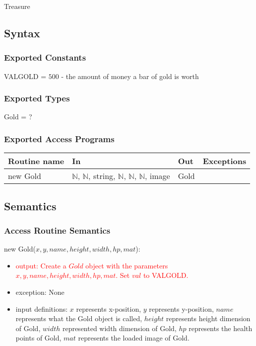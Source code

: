 \documentclass[12pt]{article}
\newcommand{\m}[1]{\mbox{#1}}
\begin{document}
Treasure

\subsection*{Syntax}

\subsubsection*{Exported Constants}

VALGOLD = $500$ - the amount of money a bar of gold is worth

\subsubsection*{Exported Types}

Gold = ?

\subsubsection*{Exported Access Programs}

\begin{tabular}{| l | l | l | l |}
\hline
\textbf{Routine name} & \textbf{In} & \textbf{Out} & \textbf{Exceptions}\\
\hline
new Gold & $\mathbb{N}$, $\mathbb{N}$, string, $\mathbb{N}$, $\mathbb{N}$, $\mathbb{N}$, image & Gold & ~\\
\hline
\end{tabular}

\subsection*{Semantics}

\subsubsection*{Access Routine Semantics}

new Gold($x, y, name, height, width, hp, mat$):
\begin{itemize}
    \item \textcolor{red}{output: Create a $Gold$ object with the parameters $x, y, name, height, width, hp, mat$. Set $val$ to VALGOLD.}
    \item exception: None
    \item input definitions: $x$ represents x-position, $y$ represents y-position, $name$ represents what the Gold object is called, $height$ represents height dimension of Gold, $width$ represented width dimension of Gold, $hp$ represents the health points of Gold, $mat$ represents the loaded image of Gold.
\end{itemize}
\end{document}
